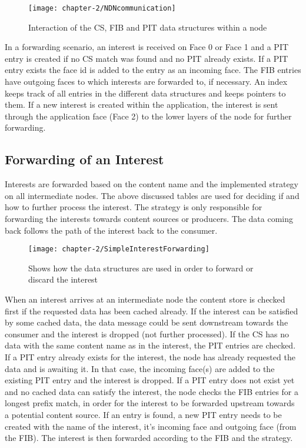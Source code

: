 \begin{figure}[H]
  \centering
  \texttt{[image: chapter-2/NDNcommunication]}
  \caption{Interaction of the CS, FIB and PIT data structures within a node \cite{ndn17}}
  \label{fig:NDNcommunication}
\end{figure}

In a forwarding scenario, an interest is received on Face 0 or Face 1 and a PIT entry is created if no CS match was found and no PIT already exists. If a PIT entry exists the face id is added to the entry as an incoming face. The FIB entries have outgoing faces to which interests are forwarded to, if necessary. An index keeps track of all entries in the different data structures and keeps pointers to them. If a new interest is created within the application, the interest is sent through the application face (Face 2) to the lower layers of the node for further forwarding. 

\subsection{Forwarding of an Interest}

Interests are forwarded based on the content name and the implemented strategy on all intermediate nodes. The above discussed tables are used for deciding if and how to further process the interest. The strategy is only responsible for forwarding the interests towards content sources or producers. The data coming back follows the path of the interest back to the consumer.

\vspace{5mm} %

\begin{figure}[H]
  \centering
  \texttt{[image: chapter-2/SimpleInterestForwarding]}
  \caption{Shows how the data structures are used in order to forward or discard the interest \cite{amadeo14}}
  \label{fig:SimpleInterestForwarding}
\end{figure}

\vspace{5mm} %

When an interest arrives at an intermediate node the content store is checked first if the requested data has been cached already. If the interest can be satisfied by some cached data, the data message could be sent downstream towards the consumer and the interest is dropped (not further processed). If the CS has no data with the same content name as in the interest, the PIT entries are checked. If a PIT entry already exists for the interest, the node has already requested the data and is awaiting it. In that case, the incoming face(s) are added to the existing PIT entry and the interest is dropped. If a PIT entry does not exist yet and no cached data can satisfy the interest, the node checks the FIB entries for a longest prefix match, in order for the interest to be forwarded upstream towards a potential content source. If an entry is found, a new PIT entry needs to be created with the name of the interest, it's incoming face and outgoing face (from the FIB). The interest is then forwarded according to the FIB and the strategy.

